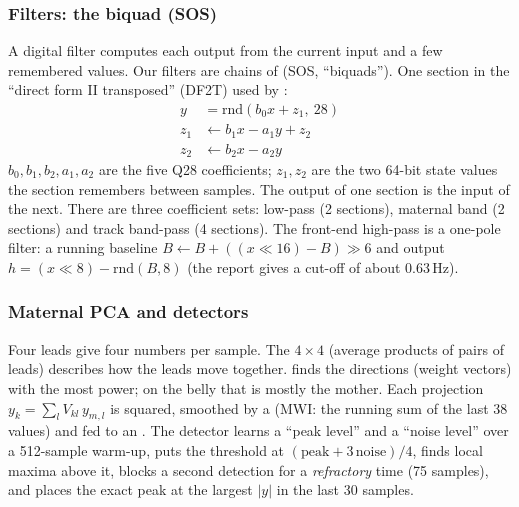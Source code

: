 \documentclass[11pt]{article}
\newcommand{\mods}[1]{\texttt{\detokenize{#1}}}   %
\begin{document}
\subsubsection*{Filters: the biquad (SOS)}
A digital filter computes each output from the current input and a few remembered values. Our filters are chains of  (SOS, ``biquads''). One section in the ``direct form II transposed'' (DF2T) used by \mods{v6_sos}:
\begin{align*}
y &= \text{rnd}(b_0 x + z_1,\ 28)\\
z_1 &\leftarrow b_1 x - a_1 y + z_2\\
z_2 &\leftarrow b_2 x - a_2 y
\end{align*}
$b_0, b_1, b_2, a_1, a_2$ are the five Q28 coefficients; $z_1, z_2$ are the two 64-bit state values the section remembers between samples. The output of one section is the input of the next. There are three coefficient sets: low-pass (2 sections), maternal band (2 sections) and track band-pass (4 sections). The front-end high-pass is a one-pole filter: a running baseline $B \leftarrow B + ((x\ll16) - B) \gg 6$ and output $h = (x \ll 8) - \text{rnd}(B, 8)$ (the report gives a cut-off of about 0.63\,Hz).

\subsubsection*{Maternal PCA and detectors}
Four leads give four numbers per sample. The $4\times4$  (average products of pairs of leads) describes how the leads move together.  finds the directions (weight vectors) with the most power; on the belly that is mostly the mother. Each projection $y_k = \sum_l V_{kl}\, y_{m,l}$ is squared, smoothed by a  (MWI: the running sum of the last 38 values) and fed to an . The detector learns a ``peak level'' and a ``noise level'' over a 512-sample warm-up, puts the threshold at $(\text{peak} + 3\,\text{noise})/4$, finds local maxima above it, blocks a second detection for a \emph{refractory} time (75 samples), and places the exact peak at the largest $|y|$ in the last 30 samples.
\end{document}
